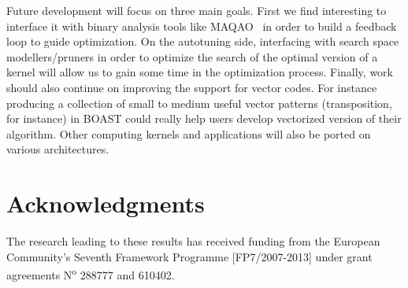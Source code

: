 \documentclass{IEEEtran}
\newcommand*{\Num}{N\textsuperscript{o}\xspace}
\begin{document}
Future development will focus on three main goals. First we find interesting to interface it with binary analysis tools like
MAQAO~\cite{djoudi2005exploring} in order to build a feedback loop to guide optimization. On the autotuning side, interfacing with search space
modellers/pruners in order to optimize the search of the optimal version of a kernel will allow us to gain some time in the optimization
process. Finally, work should also continue on improving the support for vector codes. For instance producing a collection of small to medium useful
vector patterns (transposition, for instance) in BOAST could really help users develop vectorized version of their algorithm. Other computing kernels
and applications will also be ported on various architectures.

\section*{Acknowledgments}

The research leading to these results has received funding from the European
Community's Seventh Framework Programme [FP7/2007-2013] under grant agreements
\Num 288777 and 610402.



\end{document}
